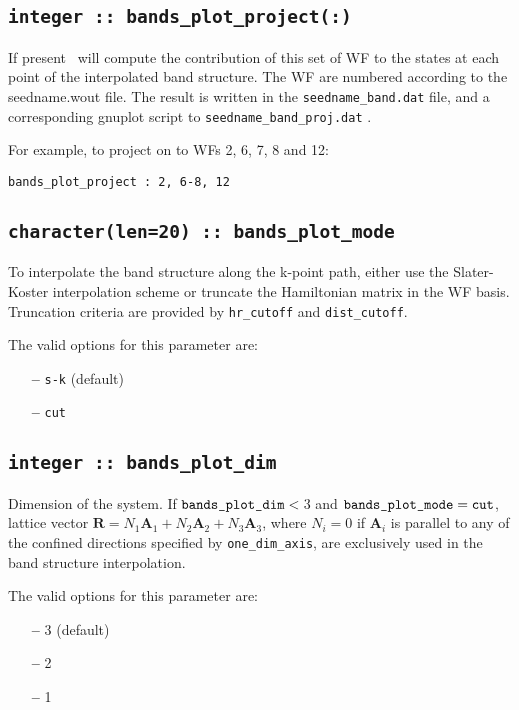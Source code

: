 \subsection[bands\_plot\_project]{\tt integer :: bands\_plot\_project(:)}

If present \wannier\ will compute the contribution of this set of WF to the
states at each point of the interpolated band structure.
The WF are numbered according to the seedname.wout file. The result is written 
in the {\tt seedname\_band.dat} file, and a corresponding gnuplot script to
{\tt seedname\_band\_proj.dat} .

 For example, to project on to WFs 2, 6, 7, 8 and 12:

 \verb#bands_plot_project : 2, 6-8, 12#


\subsection[bands\_plot\_mode]{\tt character(len=20) :: bands\_plot\_mode}

To interpolate the band structure along the k-point path,
either use the Slater-Koster interpolation scheme
or truncate the Hamiltonian matrix in the WF basis. 
Truncation criteria are provided by \verb#hr_cutoff#
and \verb#dist_cutoff#. 

The valid options for this parameter are:
\begin{itemize}
\item[{\bf --}] \verb#s-k# (default)
\item[{\bf --}] \verb#cut#
\end{itemize}

\subsection[bands\_plot\_dim]{\tt integer :: bands\_plot\_dim}

Dimension of the system.
If $\verb#bands_plot_dim#<\:$3 and $\verb#bands_plot_mode#=\verb#cut#$,
lattice vector $\mathbf{R}=N_1 \mathbf{A}_{1} + N_2 \mathbf{A}_{2} + N_3 \mathbf{A}_3$,
where $N_i=0$ if $\mathbf{A}_i$ is parallel to any of the
confined directions specified by \verb#one_dim_axis#,
are exclusively used in the band structure interpolation.

The valid options for this parameter are:
\begin{itemize}
\item[{\bf --}] 3 (default)
\item[{\bf --}] 2
\item[{\bf --}] 1
\end{itemize}


